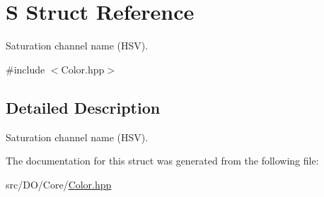 \hypertarget{struct_d_o_1_1_s}{\section{S Struct Reference}
\label{struct_d_o_1_1_s}
}


Saturation channel name (H\-S\-V).  




{\ttfamily \#include $<$Color.\-hpp$>$}



\subsection{Detailed Description}
Saturation channel name (H\-S\-V). 

The documentation for this struct was generated from the following file\-:\begin{DoxyCompactItemize}
\item 
src/\-D\-O/\-Core/\hyperlink{_color_8hpp}{Color.\-hpp}\end{DoxyCompactItemize}
